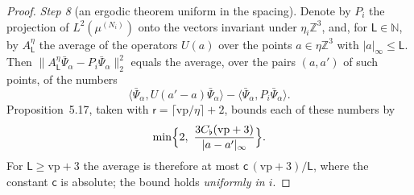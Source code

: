 \documentclass[11pt,letterpaper,reqno]{amsart}
\theoremstyle{definition}
\begin{document}
\begin{proof}
\emph{Step 8} (an ergodic theorem uniform in the spacing).
Denote by $P_i$ the projection of $L^2(\mu^{(N_i)})$ onto the vectors invariant under $\eta_i\mathbb Z^3$,
and, for $\mathsf L\in\mathbb N$, by $A^\eta_{\mathsf L}$ the average of the operators $U(a)$ over the points $a\in\eta\mathbb Z^3$ with $|a|_\infty\le\mathsf L$.
Then $\|A^\eta_{\mathsf L}\bar\Psi_\alpha-P_i\bar\Psi_\alpha\|_2^2$ equals the average, over the pairs $(a,a')$ of such points, of the numbers
\begin{equation*}
\langle\bar\Psi_\alpha,U(a'-a)\bar\Psi_\alpha\rangle-\langle\bar\Psi_\alpha,P_i\bar\Psi_\alpha\rangle.
\end{equation*}
Proposition~5.17, taken with $\mathsf r=\lceil\mathrm{vp}/\eta\rceil+2$, bounds each of these numbers by
\begin{equation*}
\min\Bigl\{2,\ \frac{3C_\flat(\mathrm{vp}+3)}{|a-a'|_\infty}\Bigr\}.
\end{equation*}
For $\mathsf L\ge\mathrm{vp}+3$ the average is therefore at most $\mathsf c\,(\mathrm{vp}+3)/\mathsf L$, where the constant $\mathsf c$ is absolute; the bound holds \emph{uniformly in $i$}.


\end{proof}
\end{document}
